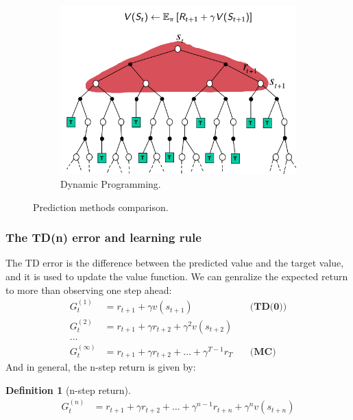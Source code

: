 \documentclass[11pt]{book} %
\newtheorem{definition}{Definition}[section]
\begin{document}
\begin{figure}
\begin{subfigure}[b]{0.3\textwidth}
        \includegraphics[width=\textwidth]{./Figs/DP_tree.png}
        \caption{Dynamic Programming.}
        \label{fig:DP_tree}
    \end{subfigure}
    \label{fig:variance}
    \caption{Prediction methods comparison.}
\end{figure}


\subsubsection{The TD(n) error and learning rule}
The TD error is the difference between the predicted value and the target value, and it is used to update the value function.
We can genralize the expected return to more than observing one step ahead: 
\begin{align*}
    G_t^{(1)} &= r_{t+1} + \gamma v(s_{t+1}) &\quad \textbf{(TD(0))} \\
    G_t^{(2)} &= r_{t+1} + \gamma r_{t+2} + \gamma^2 v(s_{t+2}) \\
    \ldots \\
    G_t^{(\infty)} &= r_{t+1} + \gamma r_{t+2} + \ldots + \gamma^{T-1} r_{T} &\quad \textbf{(MC)}
\end{align*}
And in general, the n-step return is given by:

\begin{definition}[n-step return]\ \\
    \begin{align*}
        G_t^{(n)} &= r_{t+1} + \gamma r_{t+2} + \ldots + \gamma^{n-1} r_{t+n} + \gamma^n v(s_{t+n})
    \end{align*}
\end{definition}
\end{document}
